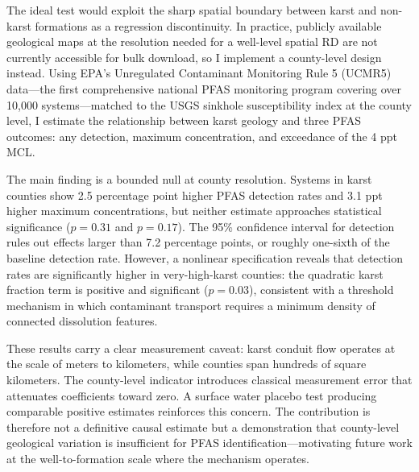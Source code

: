 \documentclass[12pt]{article}
\begin{document}
The ideal test would exploit the sharp spatial boundary between karst and non-karst formations as a regression discontinuity. In practice, publicly available geological maps at the resolution needed for a well-level spatial RD are not currently accessible for bulk download, so I implement a county-level design instead. Using EPA's Unregulated Contaminant Monitoring Rule 5 (UCMR5) data---the first comprehensive national PFAS monitoring program covering over 10,000 systems---matched to the USGS sinkhole susceptibility index at the county level, I estimate the relationship between karst geology and three PFAS outcomes: any detection, maximum concentration, and exceedance of the 4 ppt MCL.

The main finding is a bounded null at county resolution. Systems in karst counties show 2.5 percentage point higher PFAS detection rates and 3.1 ppt higher maximum concentrations, but neither estimate approaches statistical significance ($p = 0.31$ and $p = 0.17$). The 95\% confidence interval for detection rules out effects larger than 7.2 percentage points, or roughly one-sixth of the baseline detection rate. However, a nonlinear specification reveals that detection rates are significantly higher in very-high-karst counties: the quadratic karst fraction term is positive and significant ($p = 0.03$), consistent with a threshold mechanism in which contaminant transport requires a minimum density of connected dissolution features.

These results carry a clear measurement caveat: karst conduit flow operates at the scale of meters to kilometers, while counties span hundreds of square kilometers. The county-level indicator introduces classical measurement error that attenuates coefficients toward zero. A surface water placebo test producing comparable positive estimates reinforces this concern. The contribution is therefore not a definitive causal estimate but a demonstration that county-level geological variation is insufficient for PFAS identification---motivating future work at the well-to-formation scale where the mechanism operates.
\end{document}
